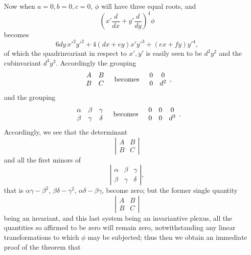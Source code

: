 \documentclass[11pt]{article}
\begin{document}
Now when $a=0,b=0,c=0$, $\phi$ will have three equal roots, and
\[
\left(x'\frac{d}{dx}+y'\frac{d}{dy}\right)^4\phi
\]
becomes
\[
6dy\,x'^2y'^2+4(dx+ey)x'y'^3+(ex+fy)y'^4,
\]
of which the quadrinvariant in respect to $x',y'$ is easily seen to be $d^2y^2$ and the cubinvariant $d^3y^3$. Accordingly the grouping
\[
\begin{array}{cc}
A&B\\ B&C
\end{array}
\quad\hbox{becomes}\quad
\begin{array}{cc}0&0\\0&d^2\end{array},
\]
and the grouping
\[
\begin{array}{ccc}
\alpha&\beta&\gamma\\
\beta&\gamma&\delta
\end{array}
\quad\hbox{becomes}\quad
\begin{array}{ccc}0&0&0\\0&0&d^3\end{array}.
\]
Accordingly, we see that the determinant
\[
\left|\begin{array}{cc}A&B\\B&C\end{array}\right|
\]
and all the first minors of
\[
\left|\begin{array}{ccc}\alpha&\beta&\gamma\\ \beta&\gamma&\delta\end{array}\right|,
\]
that is $\alpha\gamma-\beta^2$, $\beta\delta-\gamma^2$, $\alpha\delta-\beta\gamma$, become zero; but the former single quantity
\[
\left|\begin{array}{cc}A&B\\B&C\end{array}\right|
\]
being an invariant, and this last system being an invariantive plexus, all the quantities so affirmed to be zero will remain zero, notwithstanding any linear transformations to which $\phi$ may be subjected; thus then we obtain an immediate proof of the theorem that
\end{document}
